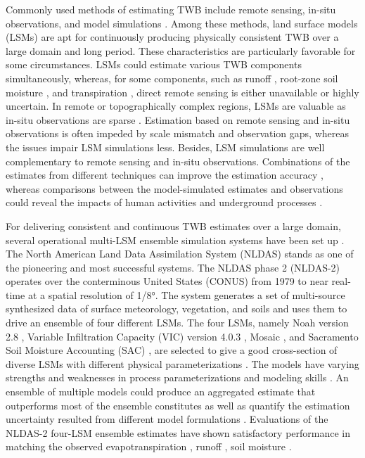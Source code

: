 \documentclass[essd]{copernicus}
\begin{document}
Commonly used methods of estimating TWB include remote sensing, in-situ observations, and model simulations \citep{saxe2021HESS, mccabe2017HESS, pan2012JC, gao2010IJRS, trenberth2007JH}. Among these methods, land surface models (LSMs) are apt for continuously producing physically consistent TWB over a large domain and long period. These characteristics are particularly favorable for some circumstances. LSMs could estimate various TWB components simultaneously, whereas, for some components, such as runoff \citep{lin2019WRR, beck2017HESS}, root-zone soil moisture \citep{xia2015JHa, xia2015JH}, and transpiration \citep{lian2018NCC}, direct remote sensing is either unavailable or highly uncertain. In remote or topographically complex regions, LSMs are valuable as in-situ observations are sparse \citep{kim2021TC}. Estimation based on remote sensing and in-situ observations is often impeded by scale mismatch and observation gaps, whereas the issues impair LSM simulations less. Besides, LSM simulations are well complementary to remote sensing and in-situ observations. Combinations of the estimates from different techniques can improve the estimation accuracy \citep{zhang2018HESS, pan2012JC}, whereas comparisons between the model-simulated estimates and observations could reveal the impacts of human activities \citep{zaussinger2019HESS} and underground processes \citep{zheng2020JAMES}.

For delivering consistent and continuous TWB estimates over a large domain, several operational multi-LSM ensemble simulation systems have been set up \citep{xia2019JMR, shi2011SCES, carrera2015JH, rodell2004BAMS}. The North American Land Data Assimilation System (NLDAS) \citep{xia2012JGRA, xia2012JGRAa, mitchell2004JGRA} stands as one of the pioneering and most successful systems. The NLDAS phase 2 (NLDAS-2) operates over the conterminous United States (CONUS) from 1979 to near real-time at a spatial resolution of 1/8°. The system generates a set of multi-source synthesized data of surface meteorology, vegetation, and soils and uses them to drive an ensemble of four different LSMs. The four LSMs, namely Noah version 2.8 \citep{ek2003JGRA, chen2001MWR, chen2001MWRa, chen1997BM}, Variable Infiltration Capacity (VIC) version 4.0.3 \citep{liang1994JGRA}, Mosaic \citep{koster1992JGRA}, and Sacramento Soil Moisture Accounting (SAC) \citep{burnash1973}, are selected to give a good cross-section of diverse LSMs with different physical parameterizations \citep{mitchell2004JGRA}. The models have varying strengths and weaknesses in process parameterizations and modeling skills \citep{kumar2017WRR}. An ensemble of multiple models could produce an aggregated estimate that outperforms most of the ensemble constitutes \citep{fei2021WRR, beck2017HESS, guo2007QJRMS, ajami2007WRR} as well as quantify the estimation uncertainty resulted from different model formulations \citep{troin2021WRR, cloke2009JoH}. Evaluations of the NLDAS-2 four-LSM ensemble estimates have shown satisfactory performance in matching the observed evapotranspiration \citep{zhang2020AFM, xia2012JGRA, kumar2018RS}, runoff \citep{xia2012JGRAa}, soil moisture \citep{xia2015JH, xia2015JHa}.
\end{document}
